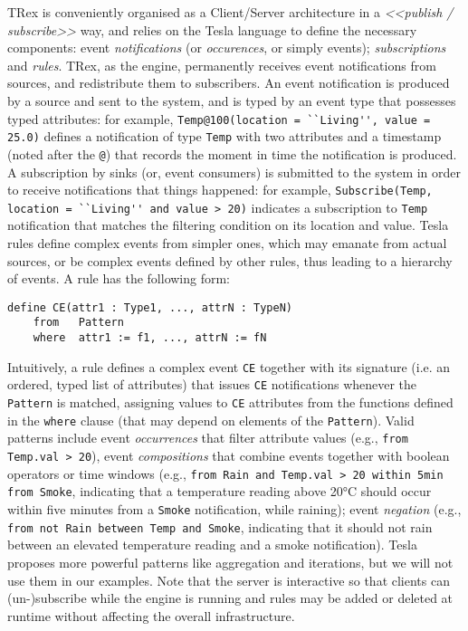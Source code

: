 TRex is conveniently organised as a Client/Server architecture in a \textit{<<publish / subscribe>>} way, and relies on the Tesla language to define the necessary components: event \emph{notifications} (or \emph{occurences}, or simply events); \emph{subscriptions} and \emph{rules}. TRex, as the \CEP engine, permanently receives event notifications from sources, and redistribute them to subscribers. 
An event notification is produced by a source and sent to the \CEP system, and is typed by an event type that possesses typed attributes: for example, \lstinline[language=tesla]{Temp@100(location = ``Living'', value = 25.0)} defines a notification of type \lstinline[language=tesla]{Temp} with two attributes and a timestamp (noted after the \lstinline[language=tesla]{@}) that records the moment in time the notification is produced. A subscription by sinks (or, event consumers) is submitted to the \CEP system in order to receive notifications that things happened: for example, \lstinline[language=tesla]{Subscribe(Temp, location = ``Living'' and value > 20)} indicates a subscription to \lstinline[language=tesla]{Temp} notification that matches the filtering condition on its location and value. Tesla rules define complex events from simpler ones, which may emanate from actual sources, or be complex events defined by other rules, thus leading to a hierarchy of events. A rule has the following form:
\begin{lstlisting}[language=tesla]
	define CE(attr1 : Type1, ..., attrN : TypeN)
	from   Pattern
	where  attr1 := f1, ..., attrN := fN
\end{lstlisting}
Intuitively, a rule defines a complex event \lstinline[language=tesla]{CE} together with its signature (i.e. an ordered, typed list of attributes) that issues \lstinline[language=tesla]{CE} notifications whenever the \lstinline[language=tesla]{Pattern} is matched, assigning values to \lstinline[language=tesla]{CE} attributes from the functions defined in the \lstinline[language=tesla]{where} clause (that may depend on elements of the \lstinline[language=tesla]{Pattern}). Valid patterns include event \emph{occurrences} that filter attribute values (e.g., \lstinline[language=tesla]{from Temp.val > 20}), event \emph{compositions} that combine events together with boolean operators or time windows (e.g., \lstinline[language=tesla]{from Rain and Temp.val > 20 within 5min from Smoke}, indicating that a temperature reading above 20°C should occur within five minutes from a \lstinline[language=tesla]{Smoke} notification, while raining); event \emph{negation} (e.g., \lstinline[language=tesla]{from not Rain between Temp and Smoke}, indicating that it should not rain between an elevated temperature reading and a smoke notification). Tesla proposes more powerful patterns like aggregation and iterations, but we will not use them in our examples.
Note that the server is interactive so that clients can (un-)subscribe while the engine is running and rules may be added or deleted at runtime without affecting the overall infrastructure. 

